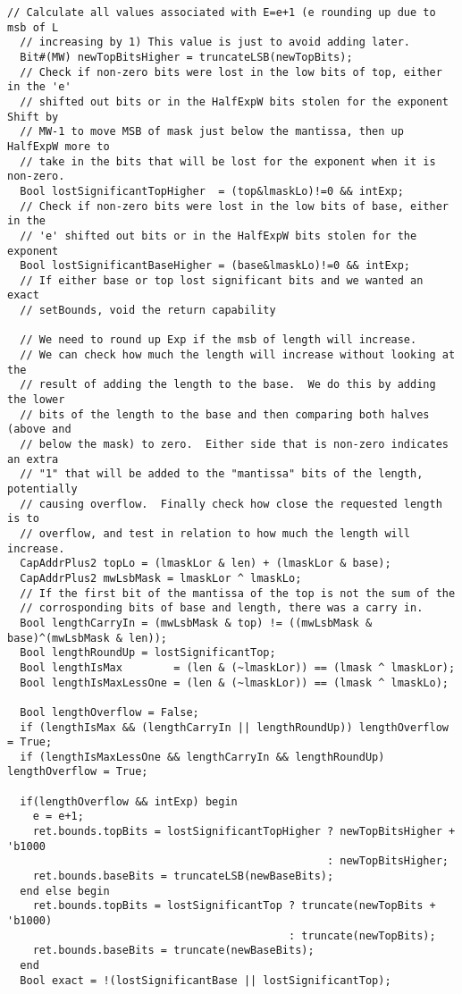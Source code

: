 \begin{lstlisting}[language=bluespec]
  // Calculate all values associated with E=e+1 (e rounding up due to msb of L
  // increasing by 1) This value is just to avoid adding later.
  Bit#(MW) newTopBitsHigher = truncateLSB(newTopBits);
  // Check if non-zero bits were lost in the low bits of top, either in the 'e'
  // shifted out bits or in the HalfExpW bits stolen for the exponent Shift by
  // MW-1 to move MSB of mask just below the mantissa, then up HalfExpW more to
  // take in the bits that will be lost for the exponent when it is non-zero.
  Bool lostSignificantTopHigher  = (top&lmaskLo)!=0 && intExp;
  // Check if non-zero bits were lost in the low bits of base, either in the
  // 'e' shifted out bits or in the HalfExpW bits stolen for the exponent
  Bool lostSignificantBaseHigher = (base&lmaskLo)!=0 && intExp;
  // If either base or top lost significant bits and we wanted an exact
  // setBounds, void the return capability

  // We need to round up Exp if the msb of length will increase.
  // We can check how much the length will increase without looking at the
  // result of adding the length to the base.  We do this by adding the lower
  // bits of the length to the base and then comparing both halves (above and
  // below the mask) to zero.  Either side that is non-zero indicates an extra
  // "1" that will be added to the "mantissa" bits of the length, potentially
  // causing overflow.  Finally check how close the requested length is to
  // overflow, and test in relation to how much the length will increase.
  CapAddrPlus2 topLo = (lmaskLor & len) + (lmaskLor & base);
  CapAddrPlus2 mwLsbMask = lmaskLor ^ lmaskLo;
  // If the first bit of the mantissa of the top is not the sum of the
  // corrosponding bits of base and length, there was a carry in.
  Bool lengthCarryIn = (mwLsbMask & top) != ((mwLsbMask & base)^(mwLsbMask & len));
  Bool lengthRoundUp = lostSignificantTop;
  Bool lengthIsMax        = (len & (~lmaskLor)) == (lmask ^ lmaskLor);
  Bool lengthIsMaxLessOne = (len & (~lmaskLor)) == (lmask ^ lmaskLo);

  Bool lengthOverflow = False;
  if (lengthIsMax && (lengthCarryIn || lengthRoundUp)) lengthOverflow = True;
  if (lengthIsMaxLessOne && lengthCarryIn && lengthRoundUp) lengthOverflow = True;

  if(lengthOverflow && intExp) begin
    e = e+1;
    ret.bounds.topBits = lostSignificantTopHigher ? newTopBitsHigher + 'b1000
                                                  : newTopBitsHigher;
    ret.bounds.baseBits = truncateLSB(newBaseBits);
  end else begin
    ret.bounds.topBits = lostSignificantTop ? truncate(newTopBits + 'b1000)
                                            : truncate(newTopBits);
    ret.bounds.baseBits = truncate(newBaseBits);
  end
  Bool exact = !(lostSignificantBase || lostSignificantTop);


\end{lstlisting}
